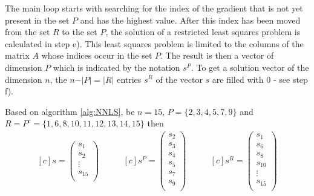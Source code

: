 The main loop starts with searching for the index of the gradient that is not yet present in the set $P$ and has the highest value. After this index has been moved from the set $R$ to the set $P$, the solution of a restricted least squares problem is calculated in step e). This least squares problem is limited to the columns of the matrix $A$ whose indices occur in the set $P$. The result is then a vector of dimension $P$ which is indicated by the notation $s^P$. To get a solution vector of the dimension $n$, the $n - \vert P \vert = \vert R \vert$ entries $s^R$ of the vector $s$ are filled with 0 - see step f). 

\begin{example}
	Based on algorithm \ref{alg:NNLS}, be $n = 15$, $P = \{2, 3, 4, 5, 7, 9\}$ and  $R = P^c = \{1, 6, 8, 10, 11, 12, 13, 14, 15\}$ then
	\begin{equation*}
		\begin{aligned}[c]	
		s = 
		\left( 
		\begin{array}{c}
		s_{1} \\
		s_{2} \\
		\vdots\\
		s_{15}\\
		\end{array}
		\right)	
		\end{aligned}
		\qquad
		\begin{aligned}[c]
		s^P = 
		\left( 
		\begin{array}{c}
		s_{2} \\
		s_{3} \\
		s_{4} \\
		s_{5} \\
		s_{7} \\
		s_{9} \\
		\end{array}
		\right)	
		\end{aligned}
		\qquad
		\begin{aligned}[c]
		s^R = 
		\left( 
		\begin{array}{c}
		s_{1} \\
		s_{6} \\
		s_{8} \\
		s_{10} \\
		\vdots \\
		s_{15} \\
		\end{array}
		\right)	
		\end{aligned}	
	\end{equation*}
\end{example}

